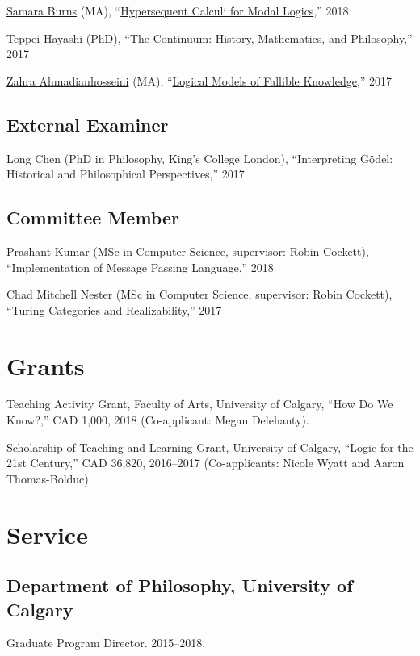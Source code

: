 \documentclass[11pt]{article}
\begin{document}
\ind \href{https://phil.ucalgary.ca/profiles/samara-burns}{Samara Burns} (MA), ``\href{https://prism.ucalgary.ca/handle/1880/106539}{Hypersequent Calculi for Modal Logics},'' 2018

\ind Teppei Hayashi (PhD), ``\href{https://prism.ucalgary.ca/handle/1880/106283}{The Continuum: History, Mathematics, and Philosophy},'' 2017

\ind \href{http://logic.berkeley.edu/students.html}{Zahra Ahmadianhosseini} (MA), ``\href{https://prism.ucalgary.ca/handle/11023/3942}{Logical Models of Fallible Knowledge},'' 2017

\subsection{External Examiner}
\ind Long Chen (PhD in Philosophy, King's College London), ``Interpreting Gödel: Historical and Philosophical Perspectives,'' 2017

\subsection{Committee Member}
\ind Prashant Kumar (MSc in Computer Science, supervisor: Robin Cockett), ``Implementation of Message Passing Language,'' 2018

\ind Chad Mitchell Nester (MSc in Computer Science, supervisor: Robin Cockett), ``Turing Categories and Realizability,'' 2017


\section{Grants}

\ind Teaching Activity Grant, Faculty of Arts, University of Calgary, ``How Do We Know?,'' CAD 1,000, 2018 (Co-applicant: Megan Delehanty).

\ind Scholarship of Teaching and Learning Grant, University of Calgary, ``Logic for the 21st Century,'' CAD 36,820, 2016--2017 (Co-applicants: Nicole Wyatt and Aaron Thomas-Bolduc).


\section{Service}

\subsection{Department of Philosophy, University of Calgary}
\ind Graduate Program Director. 2015--2018.
\end{document}
